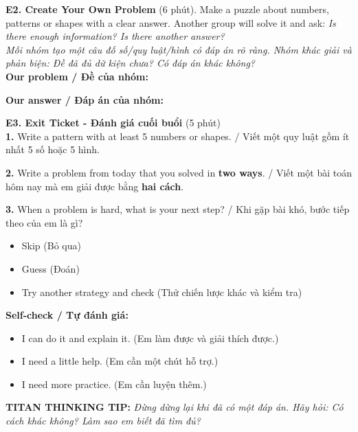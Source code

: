 \documentclass[11pt,a4paper]{article}
\newcommand{\answerline}{\noindent\dotfill\par\vspace{0.8mm}}
\begin{document}
\textbf{E2. Create Your Own Problem} (6 phút). Make a puzzle about numbers, patterns or shapes with a clear answer. Another group will solve it and ask: \textit{Is there enough information? Is there another answer?}\\
\textit{Mỗi nhóm tạo một câu đố số/quy luật/hình có đáp án rõ ràng. Nhóm khác giải và phản biện: Đề đã đủ dữ kiện chưa? Có đáp án khác không?}\\
\textbf{Our problem / Đề của nhóm:} \answerline
\answerline
\textbf{Our answer / Đáp án của nhóm:} \answerline

\textbf{E3. Exit Ticket - Đánh giá cuối buổi} (5 phút)\\
\textbf{1.} Write a pattern with at least 5 numbers or shapes. / Viết một quy luật gồm ít nhất 5 số hoặc 5 hình.\\
\answerline
\textbf{2.} Write a problem from today that you solved in \textbf{two ways}. / Viết một bài toán hôm nay mà em giải được bằng \textbf{hai cách}.\\
\answerline
\textbf{3.} When a problem is hard, what is your next step? / Khi gặp bài khó, bước tiếp theo của em là gì?\\
\begin{itemize}[label=$\square$,leftmargin=12mm,itemsep=0.5mm]
\item Skip (Bỏ qua)
\item Guess (Đoán)
\item Try another strategy and check (Thử chiến lược khác và kiểm tra)
\end{itemize}
\textbf{Self-check / Tự đánh giá:}
\begin{itemize}[label=$\square$,leftmargin=12mm,itemsep=0.5mm]
\item I can do it and explain it. (Em làm được và giải thích được.)
\item I need a little help. (Em cần một chút hỗ trợ.)
\item I need more practice. (Em cần luyện thêm.)
\end{itemize}

\textbf{TITAN THINKING TIP:} \textit{Đừng dừng lại khi đã có một đáp án. Hãy hỏi: Có cách khác không? Làm sao em biết đã tìm đủ?}
\end{document}
